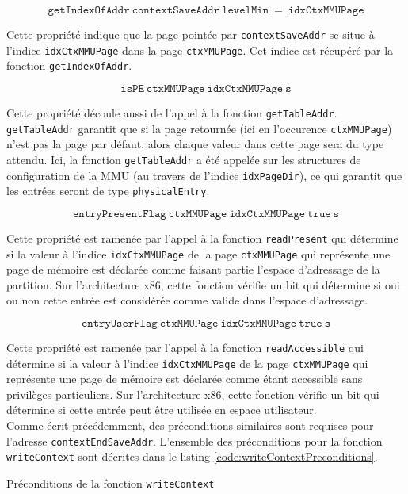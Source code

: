 			$$\mathtt{getIndexOfAddr~contextSaveAddr~levelMin}~=~\mathtt{idxCtxMMUPage}$$

			Cette propriété indique que la page pointée par \texttt{contextSaveAddr} se situe à l'indice \texttt{idxCtxMMUPage} dans la page \texttt{ctxMMUPage}. Cet indice est récupéré par la fonction \texttt{getIndexOfAddr}.

			$$\mathtt{isPE~ctxMMUPage~idxCtxMMUPage~s}$$

			Cette propriété découle aussi de l'appel à la fonction \texttt{getTableAddr}. \texttt{getTableAddr} garantit que si la page retournée (ici en l'occurence \texttt{ctxMMUPage}) n'est pas la page par défaut, alors chaque valeur dans cette page sera du type attendu. Ici, la fonction \texttt{getTableAddr} a été appelée sur les structures de configuration de la MMU (au travers de l'indice \texttt{idxPageDir}), ce qui garantit que les entrées seront de type \texttt{physicalEntry}.

			$$\mathtt{entryPresentFlag~ctxMMUPage~idxCtxMMUPage~true~s}$$

			Cette propriété est ramenée par l'appel à la fonction \texttt{readPresent} qui détermine si la valeur à l'indice \texttt{idxCtxMMUPage} de la page \texttt{ctxMMUPage} qui représente une page de mémoire est déclarée comme faisant partie l'espace d'adressage de la partition. Sur l'architecture x86, cette fonction vérifie un bit qui détermine si oui ou non cette entrée est considérée comme valide dans l'espace d'adressage.

			$$\mathtt{entryUserFlag~ctxMMUPage~idxCtxMMUPage~true~s}$$

			Cette propriété est ramenée par l'appel à la fonction \texttt{readAccessible} qui détermine si la valeur à l'indice \texttt{idxCtxMMUPage} de la page \texttt{ctxMMUPage} qui représente une page de mémoire est déclarée comme étant accessible sans privilèges particuliers. Sur l'architecture x86, cette fonction vérifie un bit qui détermine si cette entrée peut être utilisée en espace utilisateur.\\

			Comme écrit précédemment, des préconditions similaires sont requises pour l'adresse \texttt{contextEndSaveAddr}. L'ensemble des préconditions pour la fonction \texttt{writeContext} sont décrites dans le listing \ref{code:writeContextPreconditions}.

			
			\newpage

			\begin{listing}[!ht]
				\caption{Préconditions de la fonction \texttt{writeContext}}
				\label{code:writeContextPreconditions}
			\end{listing}

